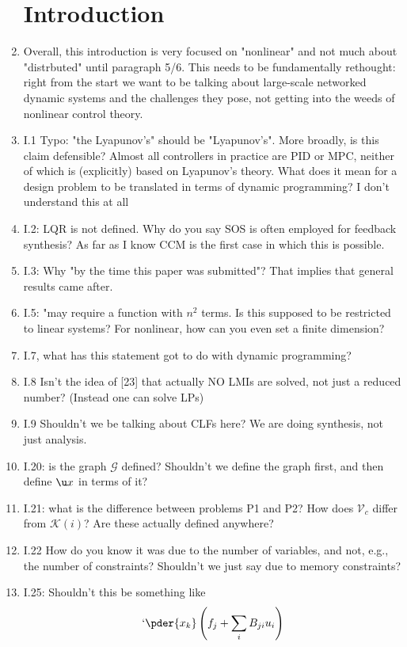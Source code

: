 \documentclass[11pt]{article}
\begin{document}
\begin{enumerate}
\section{Introduction}
	\item Overall, this introduction is very focused on "nonlinear" and not much about "distrbuted" until paragraph 5/6. This needs to be fundamentally rethought: right from the start we want to be talking about large-scale networked dynamic systems and the challenges they pose, not getting into the weeds of nonlinear control theory.
	\item I.1 Typo: "the Lyapunov's" should be "Lyapunov's". More broadly, is this claim defensible? Almost all controllers in practice are PID or MPC, neither of which is (explicitly) based on Lyapunov's theory. What does it mean for a design problem to be translated in terms of dynamic programming? I don't understand this at all
	\item I.2: LQR is not defined. Why do you say SOS is often employed for feedback synthesis? As far as I know CCM is the first case in which this is possible.
	\item I.3: Why "by the time this paper was submitted"? That implies that general results came after. 
	\item I.5: "may require a function with $n^2$ terms. Is this supposed to be restricted to linear systems? For nonlinear, how can you even set a finite dimension?
	\item I.7, what has this statement got to do with dynamic programming?
	\item I.8 Isn't the idea of [23] that actually NO LMIs are solved, not just a reduced number? (Instead one can solve LPs)
	\item I.9 Shouldn't we be talking about CLFs here? We are doing synthesis, not just analysis.
	\item I.20: is the graph $\mathcal G$ defined? Shouldn't we define the graph first, and then define $\u x$ in terms of it?
	\item I.21: what is the difference between problems P1 and P2? How does $\mathcal V_c$ differ from $\mathcal K(i)$? Are these actually defined anywhere?
	\item I.22 How do you know it was due to the number of variables, and not, e.g., the number of constraints? Shouldn't we just say due to memory constraints?
	\item I.25: Shouldn't this be something like
	\[
`	\pder{x_k}\left(f_j+\sum_iB_{ji}u_i\right)
\]
\end{enumerate}
\end{document}
